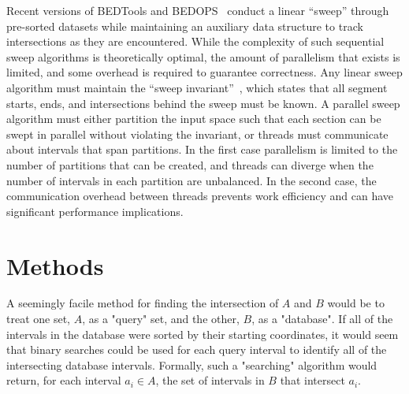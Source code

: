 \documentclass{bioinfo}
\begin{document}
Recent versions of BEDTools and BEDOPS~\citep{neph2012} conduct a
linear ``sweep'' through pre-sorted datasets while maintaining an auxiliary
data structure to track intersections as they are encountered. While the
complexity of such sequential sweep algorithms is theoretically optimal, the 
amount of parallelism that exists is limited, and some overhead is required to
guarantee correctness.  Any linear sweep algorithm must maintain the ``sweep
invariant''~\citep{mckenney2009}, which states that all segment starts, ends, 
and intersections behind the sweep must be known.  A parallel sweep algorithm
must either partition the input space such that each section can be swept in
parallel without violating the invariant, or threads must communicate 
about intervals that span partitions.  In the first case parallelism is limited
to the number of partitions that can be created, and threads can diverge when 
the number of intervals in each partition are unbalanced.  In the second case,
the communication overhead between threads prevents work efficiency and can 
have significant performance implications.



\section{Methods}


A seemingly facile method for finding the intersection of $A$ and $B$ would be
to treat one set, $A$, as a "query" set, and the other, $B$, as a "database". If
all of the intervals in the database were sorted by their starting coordinates,
it would seem that binary searches could be used for each query interval to
identify all of the intersecting database intervals. Formally, such a
"searching" algorithm would return, for each interval $a_i \in A$, the set of
intervals in $B$ that intersect $a_i$.
\end{document}
